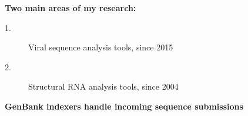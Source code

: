 \documentclass[landscape]{slides}
\begin{document}
\begin{slide}
\begin{center}
\textbf{Two main areas of my research:}

\small
\begin{description}
\item[1.] Viral sequence analysis tools, since 2015
\item[2.] Structural RNA analysis tools, since 2004
\end{description}

\end{center}
\vfill
\end{slide}
\begin{slide}
\begin{center}
\large{\textbf{GenBank indexers handle incoming sequence submissions}}
\end{center}


\vfill
\end{slide}
\end{document}
